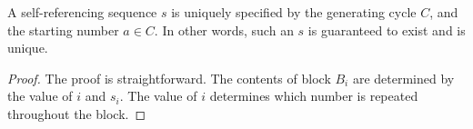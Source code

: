 \documentclass[runningheads,a4paper]{llncs}
\begin{document}
\begin{proposition}
A self-referencing sequence $s$ is uniquely specified by the generating cycle $C$, and the starting number $a \in C$. In other words, such an $s$ is guaranteed to exist and is unique.
\end{proposition}
\begin{proof} 
The proof is straightforward. The contents of block $B_i$ are determined by the value of $i$ and $s_i$. The value of $i$ determines which number is repeated throughout the block. 
\end{proof}
%
%
%
%
%
%
%
\end{document}
